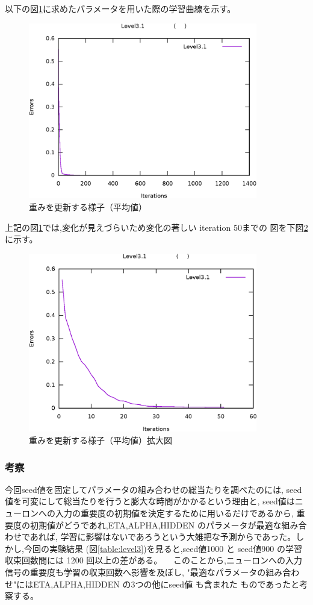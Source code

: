 以下の図\ref{fig:level3-1}に求めたパラメータを用いた際の学習曲線を示す。
\begin{figure}[H]
 \begin{center}
  \includegraphics[width=10.0cm]{figs/level3_1/averageGraph.eps}
  \caption{重みを更新する様子（平均値）}
  \label{fig:level3-1}
 \end{center}
\end{figure}

上記の図\ref{fig:level3-1}では,変化が見えづらいため変化の著しい iteration 50までの
図を下図\ref{fig:level3-1-2}に示す。
\begin{figure}[H]
 \begin{center}
  \includegraphics[width=10.0cm]{figs/level3_1/averageGraph2.eps}
  \caption{重みを更新する様子（平均値）拡大図}
  \label{fig:level3-1-2}
 \end{center}
\end{figure}

\subsubsection{考察}
今回seed値を固定してパラメータの組み合わせの総当たりを調べたのには,
seed値を可変にして総当たりを行うと膨大な時間がかかるという理由と,
seed値はニューロンへの入力の重要度の初期値を決定するために用いるだけであるから,
重要度の初期値がどうであれ,ETA,ALPHA,HIDDEN のパラメータが最適な組み合わせであれば,
学習に影響はないであろうという大雑把な予測からであった。しかし,今回の実験結果
(図\ref{table:level3})を見ると,seed値1000 と seed値900 の学習収束回数間には
1200 回以上の差がある。
　このことから,ニューロンへの入力信号の重要度も学習の収束回数へ影響を及ぼし,
"最適なパラメータの組み合わせ"にはETA,ALPHA,HIDDEN の3つの他にseed値 も含まれた
ものであったと考察する。
